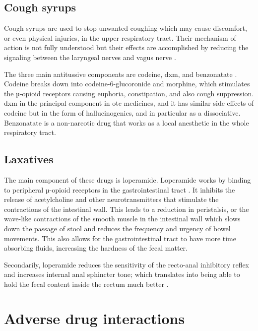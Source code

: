 \subsection{Cough syrups}

Cough syrups are used to stop unwanted coughing which may cause discomfort, or even physical injuries, in the upper respiratory tract. Their mechanism of action is not fully understood but their effects are accomplished by reducing the signaling between the laryngeal nerves and vagus nerve \cite{Bardal2011}.

The three main antitussive components are codeine, \gls{dxm}, and benzonatate \cite{Beharry2016}. Codeine breaks down into codeine-6-glucoronide and morphine, which stimulates the µ-opioid receptors \cite{Schulz2004} causing euphoria, constipation, and also cough suppression. \gls{dxm} in the principal component in \gls{otc} medicines, and it has similar side effects of codeine but in the form of hallucinogenics, and in particular as a dissociative. Benzonatate is a non-narcotic drug that works as a local anesthetic in the whole respiratory tract. 

\subsection{Laxatives}

The main component of these drugs is loperamide. Loperamide works by binding to peripheral µ-opioid receptors in the gastrointestinal tract \cite{Malinky2021}. It inhibits the release of acetylcholine and other neurotransmitters that stimulate the contractions of the intestinal wall. This leads to a reduction in peristalsis, or the wave-like contractions of the smooth muscle in the intestinal wall which slows down the passage of stool and reduces the frequency and urgency of bowel movements. This also allows for the gastrointestinal tract to have more time absorbing fluids, increasing the hardness of the fecal matter.

Secondarily, loperamide reduces the sensitivity of the recto-anal inhibitory reflex and increases internal anal sphincter tone; which translates into being able to hold the fecal content inside the rectum much better \cite{Musial1992}.
 
\section{Adverse drug interactions}

